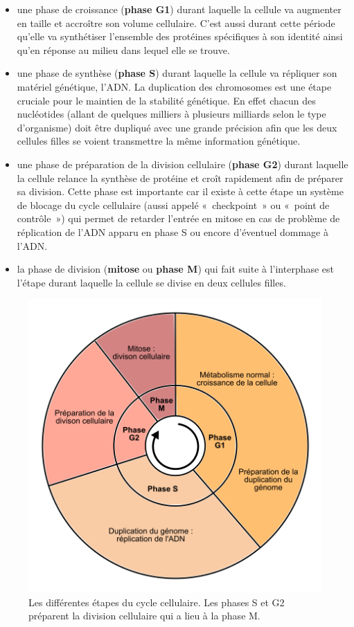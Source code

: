 \documentclass[12pt,a4paper,twoside,openright]{book}
\begin{document}
\begin{itemize}
\item
  une phase de croissance (\textbf{phase G1}) durant laquelle la cellule
  va augmenter en taille et accroître son volume cellulaire. C'est aussi
  durant cette période qu'elle va synthétiser l'ensemble des protéines
  spécifiques à son identité ainsi qu'en réponse au milieu dans lequel
  elle se trouve.
\item
  une phase de synthèse (\textbf{phase S}) durant laquelle la cellule va
  répliquer son matériel génétique, l'ADN. La duplication des
  chromosomes est une étape cruciale pour le maintien de la stabilité
  génétique. En effet chacun des nucléotides (allant de quelques
  milliers à plusieurs milliards selon le type d'organisme) doit être
  dupliqué avec une grande précision afin que les deux cellules filles
  se voient transmettre la même information génétique.
\item
  une phase de préparation de la division cellulaire (\textbf{phase G2})
  durant laquelle la cellule relance la synthèse de protéine et croît
  rapidement afin de préparer sa division. Cette phase est importante
  car il existe à cette étape un système de blocage du cycle cellulaire
  (aussi appelé «~checkpoint~» ou «~point de contrôle~») qui permet de
  retarder l'entrée en mitose en cas de problème de réplication de l'ADN
  apparu en phase S ou encore d'éventuel dommage à l'ADN.
\item
  la phase de division (\textbf{mitose} ou \textbf{phase M}) qui fait
  suite à l'interphase est l'étape durant laquelle la cellule se divise
  en deux cellules filles.
\end{itemize}

\begin{figure}[htbp]
\centering
\includegraphics{figures/intro/cycle.png}
\caption[Les différentes étapes du cycle cellulaire]{\label{fig:cycle}Les
différentes étapes du cycle cellulaire. Les phases S et G2 préparent la
division cellulaire qui a lieu à la phase M.}
\end{figure}
\end{document}
